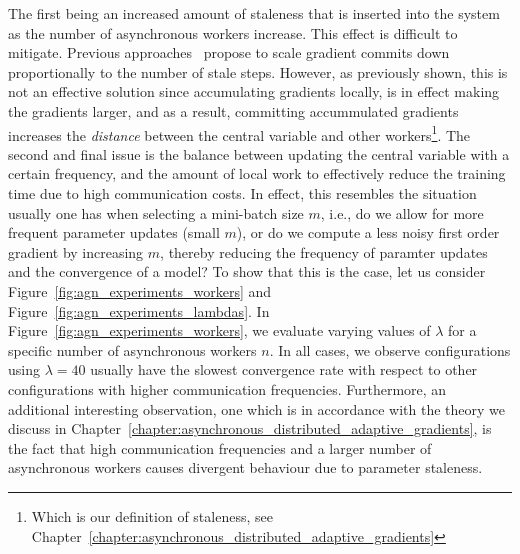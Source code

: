 The first being an increased amount of staleness that is inserted into the system as the number of asynchronous workers increase. This effect is difficult to mitigate. Previous approaches~\cite{jiang2017heterogeneity} propose to scale gradient commits down proportionally to the number of stale steps. However, as previously shown, this is not an effective solution since accumulating gradients locally, is in effect making the gradients larger, and as a result, committing accummulated gradients increases the \emph{distance} between the central variable and other workers\footnote{Which is our definition of staleness, see Chapter~\ref{chapter:asynchronous_distributed_adaptive_gradients}}. The second and final issue is the balance between updating the central variable with a certain frequency, and the amount of local work to effectively reduce the training time due to high communication costs. In effect, this resembles the situation usually one has when selecting a mini-batch size $m$, i.e., do we allow for more frequent parameter updates (small $m$), or do we compute a less noisy first order gradient by increasing $m$, thereby reducing the frequency of paramter updates and the convergence of a model? To show that this is the case, let us consider Figure~\ref{fig:agn_experiments_workers} and Figure~\ref{fig:agn_experiments_lambdas}. In Figure~\ref{fig:agn_experiments_workers}, we evaluate varying values of $\lambda$ for a specific number of asynchronous workers $n$. In all cases, we observe configurations using $\lambda = 40$ usually have the slowest convergence rate with respect to other configurations with higher communication frequencies. Furthermore, an additional interesting observation, one which is in accordance with the theory we discuss in Chapter~\ref{chapter:asynchronous_distributed_adaptive_gradients}, is the fact that high communication frequencies and a larger number of asynchronous workers causes divergent behaviour due to parameter staleness.\\

